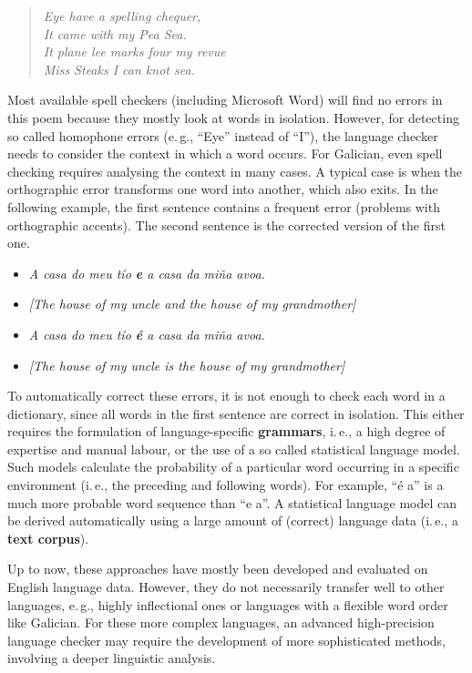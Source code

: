 \begin{multicols}{2}

\begin{verse}
\textit{Eye have a spelling chequer,} \\
\textit{It came with my Pea Sea.} \\
\textit{It plane lee marks four my revue} \\
\textit{Miss Steaks I can knot sea.}
\end{verse}

Most available spell checkers (including Microsoft Word) will find no errors in this poem because they mostly look at words in isolation. However, for detecting so called homophone errors (e.\,g., “Eye” instead of “I”), the language checker needs to consider the context in which a word occurs. For Galician, even spell checking requires analysing the context in many cases. A typical case is when the orthographic error transforms one word into another, which also exits. In the following example, the first sentence contains a frequent error (problems with orthographic accents). The second sentence is the corrected version of the first one.

\begin{itemize}
\item[] \textit{A casa do meu tío \textbf{e} a casa da miña avoa.}
\item[] \textit{[The house of my uncle and the house of my grandmother]}
\item[] \textit{A casa do meu tío \textbf{é} a casa da miña avoa.}
\item[] \textit{[The house of my uncle is the house of my grandmother]}
\end{itemize}

To automatically correct these errors, it is not enough to check each word in a dictionary, since all words in the first sentence are correct in isolation. This either requires the formulation of language-specific \textbf{grammars}, i.\,e., a high degree of expertise and manual labour, or the use of a so called statistical language model. Such models calculate the probability of a particular word occurring in a specific environment (i.\,e., the preceding and following words). For example, “é a” is a much more probable word sequence than “e a”. A statistical language model can be derived automatically using a large amount of (correct) language data (i.\,e., a \textbf{text corpus}).

Up to now, these approaches have mostly been developed and evaluated on English language data. However, they do not necessarily transfer well to other languages, e.\,g., highly inflectional ones or languages with a flexible word order like Galician. For these more complex languages, an advanced high-precision language checker may require the development of more sophisticated methods, involving a deeper linguistic analysis.


\end{multicols}
